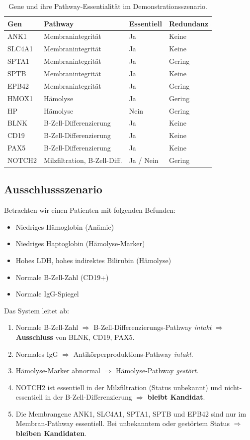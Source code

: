 \documentclass[12pt,a4paper]{article}
\begin{document}
\begin{table}[H]
\centering
\caption{Gene und ihre Pathway-Essentialität im Demonstrationsszenario.}
\label{tab:genes}
\begin{tabular}{llll}
\toprule
\textbf{Gen} & \textbf{Pathway} & \textbf{Essentiell} & \textbf{Redundanz} \\
\midrule
ANK1 & Membranintegrität & Ja & Keine \\
SLC4A1 & Membranintegrität & Ja & Keine \\
SPTA1 & Membranintegrität & Ja & Gering \\
SPTB & Membranintegrität & Ja & Keine \\
EPB42 & Membranintegrität & Ja & Gering \\
HMOX1 & Hämolyse & Ja & Gering \\
HP & Hämolyse & Nein & Gering \\
BLNK & B-Zell-Differenzierung & Ja & Keine \\
CD19 & B-Zell-Differenzierung & Ja & Keine \\
PAX5 & B-Zell-Differenzierung & Ja & Keine \\
NOTCH2 & Milzfiltration, B-Zell-Diff. & Ja / Nein & Gering \\
\bottomrule
\end{tabular}
\end{table}

\subsection{Ausschlussszenario}

Betrachten wir einen Patienten mit folgenden Befunden:
\begin{itemize}
    \item Niedriges Hämoglobin (Anämie)
    \item Niedriges Haptoglobin (Hämolyse-Marker)
    \item Hohes LDH, hohes indirektes Bilirubin (Hämolyse)
    \item Normale B-Zell-Zahl (CD19+)
    \item Normale IgG-Spiegel
\end{itemize}

Das System leitet ab:
\begin{enumerate}
    \item Normale B-Zell-Zahl $\Rightarrow$ B-Zell-Differenzierungs-Pathway \emph{intakt} $\Rightarrow$ \textbf{Ausschluss} von BLNK, CD19, PAX5.
    \item Normales IgG $\Rightarrow$ Antikörperproduktions-Pathway \emph{intakt}.
    \item Hämolyse-Marker abnormal $\Rightarrow$ Hämolyse-Pathway \emph{gestört}.
    \item NOTCH2 ist essentiell in der Milzfiltration (Status unbekannt) und nicht-essentiell in der B-Zell-Differenzierung $\Rightarrow$ \textbf{bleibt Kandidat}.
    \item Die Membrangene ANK1, SLC4A1, SPTA1, SPTB und EPB42 sind nur im Membran-Pathway essentiell. Bei unbekanntem oder gestörtem Status $\Rightarrow$ \textbf{bleiben Kandidaten}.
\end{enumerate}
\end{document}

